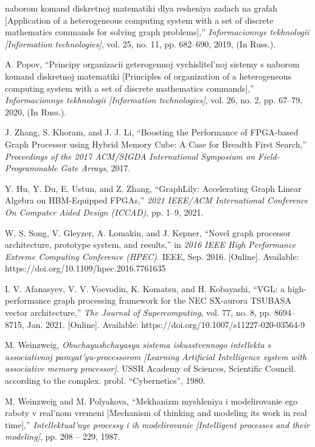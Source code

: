 \documentclass{article}
\begin{document}
{\begin{multicols}{2}
{\begin{thebibliography}{65}
naborom komand diskretnoj matematiki dlya resheniya zadach
na grafah [Application of a heterogeneous computing system
with a set of discrete mathematics commands for solving
graph problems],” \textit{Informacionnye tekhnologii [Information
technologies]}, vol. 25, no. 11, pp. 682–690, 2019, (In Russ.).
    \item A. Popov, “Principy organizacii geterogennoj vychislitel’noj
sistemy s naborom komand diskretnoj matematiki [Principles
of organization of a heterogeneous computing system with a set
of discrete mathematics commands],” \textit{Informacionnye tekhnologii
[Information technologies]}, vol. 26, no. 2, pp. 67–79, 2020, (In
Russ.).
    \item J. Zhang, S. Khoram, and J. J. Li, “Boosting the Performance of
FPGA-based Graph Processor using Hybrid Memory Cube: A Case
for Breadth First Search,” \textit{Proceedings of the 2017 ACM/SIGDA
International Symposium on Field-Programmable Gate Arrays},
2017.
    \item Y. Hu, Y. Du, E. Ustun, and Z. Zhang, “GraphLily: Accelerating Graph Linear Algebra on HBM-Equipped FPGAs,” \textit{2021
IEEE/ACM International Conference On Computer Aided Design
(ICCAD)}, pp. 1–9, 2021.
    \item W. S. Song, V. Gleyzer, A. Lomakin, and J. Kepner,
“Novel graph processor architecture, prototype system, and
results,” in \textit{2016 IEEE High Performance Extreme Computing
Conference (HPEC)}. IEEE, Sep. 2016. [Online]. Available:
https://doi.org/10.1109/hpec.2016.7761635
    \item I. V. Afanasyev, V. V. Voevodin, K. Komatsu, and H. Kobayashi,
“VGL: a high-performance graph processing framework for the
NEC SX-aurora TSUBASA vector architecture,” \textit{The Journal
of Supercomputing}, vol. 77, no. 8, pp. 8694–8715, Jan. 2021.
[Online]. Available: https://doi.org/10.1007/s11227-020-03564-9
    \item M. Weinzweig, \textit{Obuchayushchayasya sistema iskusstvennogo
intellekta s associativnoj pamyat’yu-processorom [Learning Artificial Intelligence system with associative memory processor]}.
USSR Academy of Sciences, Scientific Council. according to the
complex. probl. “Cybernetics”, 1980.
    \item M. Weinzweig and M. Polyakova, “Mekhanizm myshleniya i
modelirovanie ego raboty v real’nom vremeni [Mechanism of
thinking and modeling its work in real time],” \textit{Intellektual’nye
processy i ih modelirovanie [Intelligent processes and their
modeling]}, pp. 208 – 229, 1987.


\end{thebibliography}}
\end{multicols}}
\end{document}
